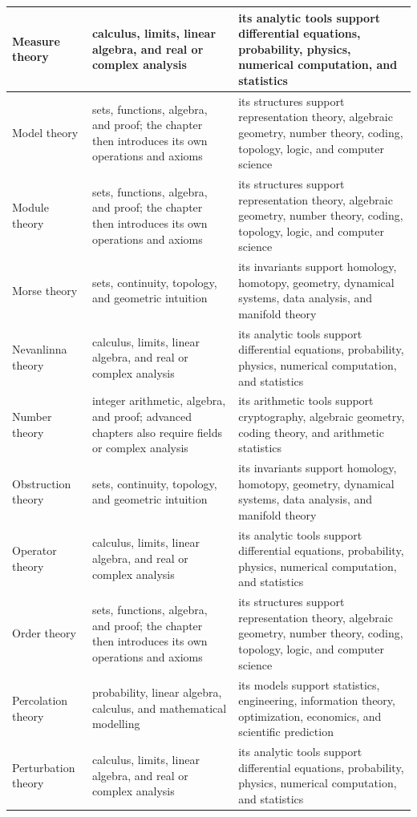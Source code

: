 \documentclass[11pt,oneside]{book}
\begin{document}
\begin{longtable}{>{\raggedright\arraybackslash}p{}>{\raggedright\arraybackslash}p{}>{\raggedright\arraybackslash}p{}}
\hline
Measure theory & calculus, limits, linear algebra, and real or complex analysis & its analytic tools support differential equations, probability, physics, numerical computation, and statistics\\
\hline
Model theory & sets, functions, algebra, and proof; the chapter then introduces its own operations and axioms & its structures support representation theory, algebraic geometry, number theory, coding, topology, logic, and computer science\\
\hline
Module theory & sets, functions, algebra, and proof; the chapter then introduces its own operations and axioms & its structures support representation theory, algebraic geometry, number theory, coding, topology, logic, and computer science\\
\hline
Morse theory & sets, continuity, topology, and geometric intuition & its invariants support homology, homotopy, geometry, dynamical systems, data analysis, and manifold theory\\
\hline
Nevanlinna theory & calculus, limits, linear algebra, and real or complex analysis & its analytic tools support differential equations, probability, physics, numerical computation, and statistics\\
\hline
Number theory & integer arithmetic, algebra, and proof; advanced chapters also require fields or complex analysis & its arithmetic tools support cryptography, algebraic geometry, coding theory, and arithmetic statistics\\
\hline
Obstruction theory & sets, continuity, topology, and geometric intuition & its invariants support homology, homotopy, geometry, dynamical systems, data analysis, and manifold theory\\
\hline
Operator theory & calculus, limits, linear algebra, and real or complex analysis & its analytic tools support differential equations, probability, physics, numerical computation, and statistics\\
\hline
Order theory & sets, functions, algebra, and proof; the chapter then introduces its own operations and axioms & its structures support representation theory, algebraic geometry, number theory, coding, topology, logic, and computer science\\
\hline
Percolation theory & probability, linear algebra, calculus, and mathematical modelling & its models support statistics, engineering, information theory, optimization, economics, and scientific prediction\\
\hline
Perturbation theory & calculus, limits, linear algebra, and real or complex analysis & its analytic tools support differential equations, probability, physics, numerical computation, and statistics\\

\end{longtable}
\end{document}
